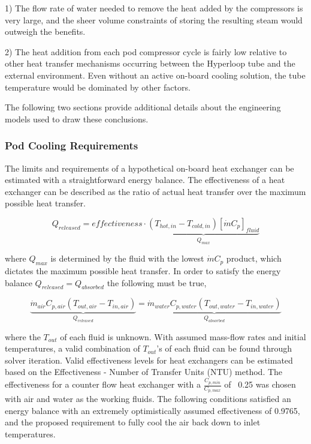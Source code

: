 \documentclass[heading.tex]{subfiles}
\begin{document}
1) The flow rate of water needed to remove the heat added by the compressors is very large,
and the sheer volume constraints of storing the resulting steam would outweigh the benefits.

2) The heat addition from each pod compressor cycle is fairly low relative to other heat transfer mechanisms
occurring between the Hyperloop tube and the external environment.
Even without an active on-board cooling solution, the tube temperature would be dominated by other factors.

The following two sections provide additional details about the engineering models used to draw these conclusions.

\subsubsection{Pod Cooling Requirements}

The limits and requirements of a hypothetical on-board heat exchanger can be estimated with a straightforward energy balance. The
effectiveness of a heat exchanger can be described as the ratio of actual heat transfer over the maximum possible heat transfer.

\begin{equation}
{Q}_{released}  = effectiveness \cdot \underbrace{\left(T_{hot,in} - T_{cold,in}\right) [ \dot{m} C_{p} ]_{fluid}}_\text{${Q}_{max}$}
\end{equation}


where ${Q}_{max}$ is determined by the fluid with the lowest $\dot{m} C_{p}$ product, which dictates the maximum possible heat transfer.
In order to satisfy the energy balance $Q_{released}=Q_{absorbed}$ the following must be true,

\begin{equation}
\underbrace{\dot{m}_{air} C_{p, air} (T_{out, air} - T_{in, air})}_{{Q}_{released}}  = \underbrace{\dot{m}_{water} C_{p,water} (T_{out, water} - T_{in, water})}_{{Q}_{absorbed}}
\end{equation}

where the $T_{out}$  of each fluid is unknown. With assumed mass-flow rates and initial temperatures, a valid combination of $T_{out}$'s of
each fluid can be found through solver iteration. Valid effectiveness levels for heat exchangers can be estimated based on the
Effectiveness - Number of Transfer Units (NTU) method. 
The effectiveness for a counter flow heat exchanger with a $\frac{C_{p,min}}{C_{p,max}}$ of ~0.25 was chosen with air and water as the working fluids. 
The following conditions satisfied an energy balance with an extremely optimistically assumed effectiveness of 0.9765,
and the proposed requirement to fully cool the air back down to inlet temperatures.
\end{document}
